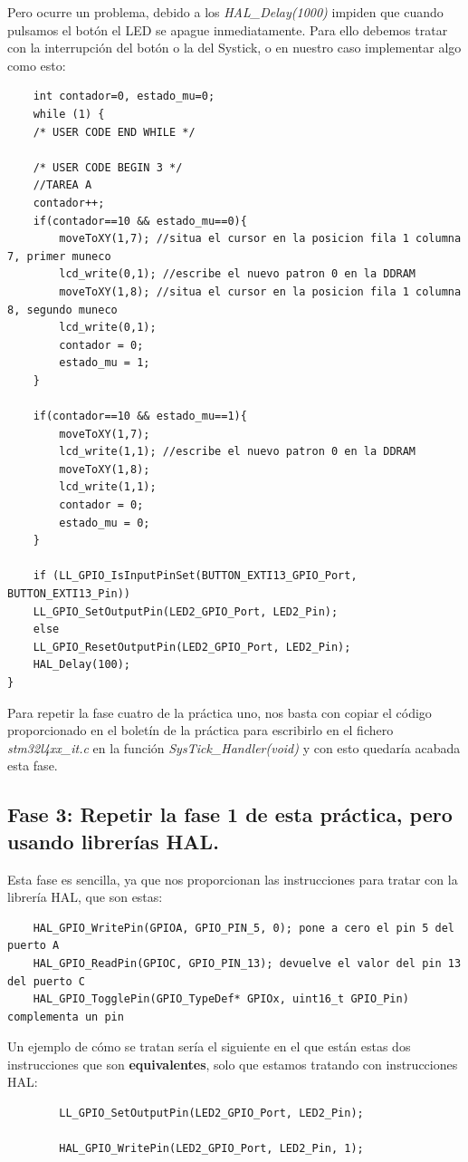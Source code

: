 \documentclass[11pt,a4paper]{article}
\begin{document}
	Pero ocurre un problema, debido a los \textit{HAL\_Delay(1000)} impiden que cuando pulsamos el botón el LED se apague inmediatamente. Para ello debemos tratar con la interrupción del botón o la del Systick, o en nuestro caso implementar algo como esto:
	\begin{lstlisting}
	int contador=0, estado_mu=0;
	while (1) {
	/* USER CODE END WHILE */
	
	/* USER CODE BEGIN 3 */
	//TAREA A
	contador++;
	if(contador==10 && estado_mu==0){
		moveToXY(1,7); //situa el cursor en la posicion fila 1 columna 7, primer muneco
		lcd_write(0,1); //escribe el nuevo patron 0 en la DDRAM
		moveToXY(1,8); //situa el cursor en la posicion fila 1 columna 8, segundo muneco
		lcd_write(0,1);
		contador = 0;
		estado_mu = 1;
	}
	
	if(contador==10 && estado_mu==1){
		moveToXY(1,7);
		lcd_write(1,1); //escribe el nuevo patron 0 en la DDRAM
		moveToXY(1,8);
		lcd_write(1,1);
		contador = 0;
		estado_mu = 0;
	}
	
	if (LL_GPIO_IsInputPinSet(BUTTON_EXTI13_GPIO_Port, BUTTON_EXTI13_Pin))
	LL_GPIO_SetOutputPin(LED2_GPIO_Port, LED2_Pin);
	else
	LL_GPIO_ResetOutputPin(LED2_GPIO_Port, LED2_Pin);
	HAL_Delay(100);
}
	\end{lstlisting}
	
	Para repetir la fase cuatro de la práctica uno, nos basta con copiar el código proporcionado en el boletín de la práctica para escribirlo en el fichero \textit{stm32l4xx\_it.c} en la función \textit{SysTick\_Handler(void)} y con esto quedaría acabada esta fase.
	
	\subsection{Fase 3: Repetir la fase 1 de esta práctica, pero usando librerías HAL.}
	Esta fase es sencilla, ya que nos proporcionan las instrucciones para tratar con la librería HAL, que son estas:
	\begin{lstlisting}
	HAL_GPIO_WritePin(GPIOA, GPIO_PIN_5, 0); pone a cero el pin 5 del puerto A
	HAL_GPIO_ReadPin(GPIOC, GPIO_PIN_13); devuelve el valor del pin 13 del puerto C
	HAL_GPIO_TogglePin(GPIO_TypeDef* GPIOx, uint16_t GPIO_Pin) complementa un pin
	\end{lstlisting}
	\vspace{1em}

	Un ejemplo de cómo se tratan sería el siguiente en el que están estas dos instrucciones que son \textbf{equivalentes}, solo que estamos tratando con instrucciones HAL:
	 \begin{lstlisting}
	 	LL_GPIO_SetOutputPin(LED2_GPIO_Port, LED2_Pin);
	 	
	 	HAL_GPIO_WritePin(LED2_GPIO_Port, LED2_Pin, 1);
	 \end{lstlisting}
	 \vspace{1em}
	 
\end{document}
